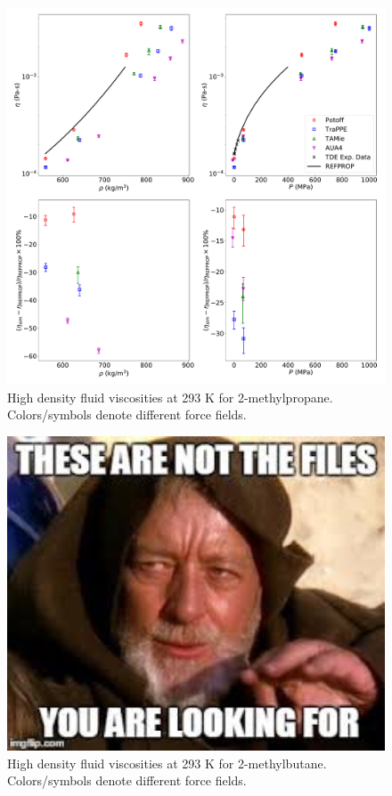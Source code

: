 \documentclass[preprint,review,12pt]{elsarticle}
\begin{document}
	\begin{figure}[p!]
		\centering
		\includegraphics[width=6.4in]{compare_REFPROP_T293highP_IC4H10.pdf}
		\caption{High density fluid viscosities at 293 K for 2-methylpropane. Colors/symbols denote different force fields.}
		\label{fig:T293highP_IC4}
	\end{figure} 
	
	\begin{figure}[p!]
		\centering
		\includegraphics[width=6.4in]{empty_figure.jpg}
		\caption{High density fluid viscosities at 293 K for 2-methylbutane. Colors/symbols denote different force fields.}
		\label{fig:T293highP_IC5}
	\end{figure} 
	
\end{document}

